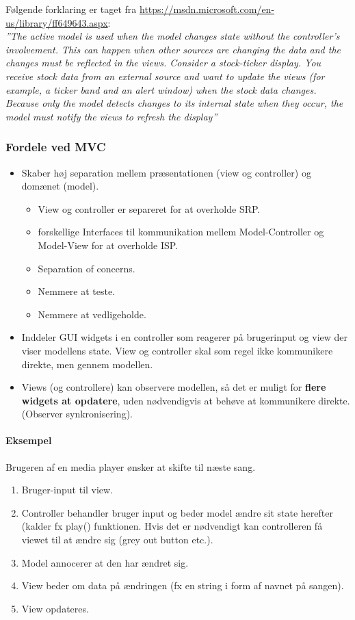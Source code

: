 Følgende forklaring er taget fra \url{https://msdn.microsoft.com/en-us/library/ff649643.aspx}:\\

\textit{''The active model is used when the model changes state without the controller's involvement. This can happen when other sources are changing the data and the changes must be reflected in the views. Consider a stock-ticker display. You receive stock data from an external source and want to update the views (for example, a ticker band and an alert window) when the stock data changes. Because only the model detects changes to its internal state when they occur, the model must notify the views to refresh the display''}

\subsubsection{Fordele ved MVC}
\begin{itemize}
	\item Skaber høj separation mellem præsentationen (view og controller) og domænet (model).
	\begin{itemize}
		\item View og controller er separeret for at overholde SRP.
		\item forskellige Interfaces til kommunikation mellem Model-Controller og Model-View for at overholde ISP.
		\item Separation of concerns.
		\item Nemmere at teste.
		\item Nemmere at vedligeholde.
	\end{itemize}
	\item Inddeler GUI widgets i en controller som reagerer på brugerinput og view der viser modellens state. View og controller skal som regel ikke kommunikere direkte, men gennem modellen.
	\item Views (og controllere) kan observere modellen, så det er muligt for \textbf{flere widgets at opdatere}, uden nødvendigvis at behøve at kommunikere direkte. (Observer synkronisering).
\end{itemize}

\paragraph{Eksempel}
Brugeren af en media player ønsker at skifte til næste sang.

\begin{enumerate}
	\item Bruger-input til view.
	\item Controller behandler bruger input og beder model ændre sit state herefter (kalder fx play() funktionen. Hvis det er nødvendigt kan controlleren få viewet til at ændre sig (grey out button etc.).
	\item Model annocerer at den har ændret sig.
	\item View beder om data på ændringen (fx en string i form af navnet på sangen).
	\item View opdateres.
\end{enumerate}


